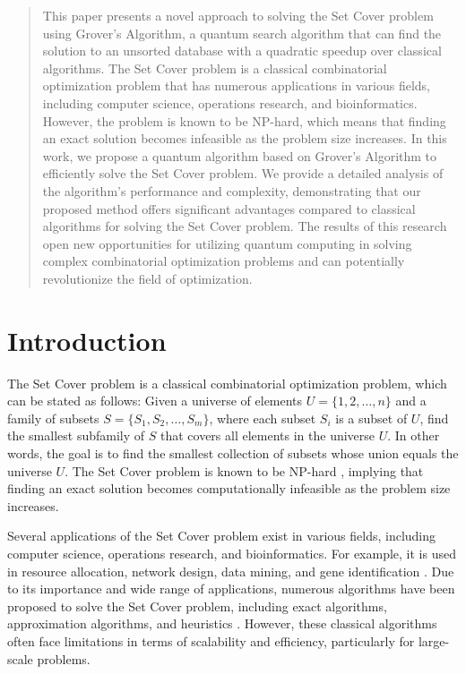 \begin{abstract}
This paper presents a novel approach to solving the Set Cover problem using Grover's Algorithm, a quantum search algorithm that can find the solution to an unsorted database with a quadratic speedup over classical algorithms. The Set Cover problem is a classical combinatorial optimization problem that has numerous applications in various fields, including computer science, operations research, and bioinformatics. However, the problem is known to be NP-hard, which means that finding an exact solution becomes infeasible as the problem size increases. In this work, we propose a quantum algorithm based on Grover's Algorithm to efficiently solve the Set Cover problem. We provide a detailed analysis of the algorithm's performance and complexity, demonstrating that our proposed method offers significant advantages compared to classical algorithms for solving the Set Cover problem. The results of this research open new opportunities for utilizing quantum computing in solving complex combinatorial optimization problems and can potentially revolutionize the field of optimization.
\end{abstract}

\section{Introduction}
\label{sec:introduction}

The Set Cover problem is a classical combinatorial optimization problem, which can be stated as follows: Given a universe of elements $U = \{1, 2, \ldots, n\}$ and a family of subsets $S = \{S_1, S_2, \ldots, S_m\}$, where each subset $S_i$ is a subset of $U$, find the smallest subfamily of $S$ that covers all elements in the universe $U$. In other words, the goal is to find the smallest collection of subsets whose union equals the universe $U$. The Set Cover problem is known to be NP-hard \cite{Karp1972}, implying that finding an exact solution becomes computationally infeasible as the problem size increases.

Several applications of the Set Cover problem exist in various fields, including computer science, operations research, and bioinformatics. For example, it is used in resource allocation, network design, data mining, and gene identification \cite{Chvatal1979, Hochbaum1997, Feige1998}. Due to its importance and wide range of applications, numerous algorithms have been proposed to solve the Set Cover problem, including exact algorithms, approximation algorithms, and heuristics \cite{Vazirani2001, Cormen2009}. However, these classical algorithms often face limitations in terms of scalability and efficiency, particularly for large-scale problems.

